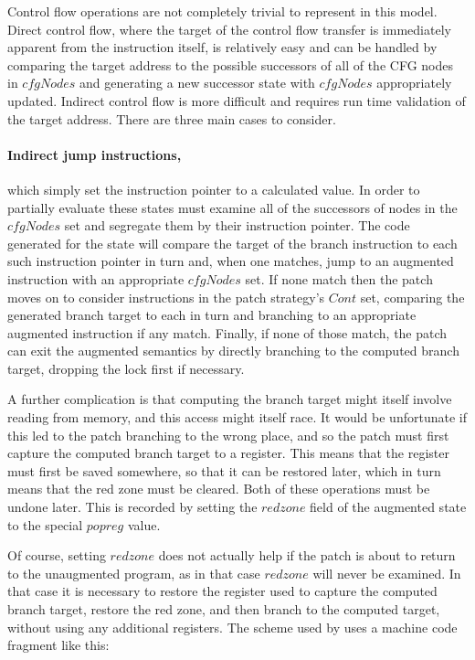 
Control flow operations are not completely trivial to represent in
this model.  Direct control flow, where the target of the control flow
transfer is immediately apparent from the instruction itself, is
relatively easy and can be handled by comparing the target address to
the possible successors of all of the CFG nodes in $cfgNodes$ and
generating a new successor state with $cfgNodes$ appropriately
updated.  Indirect control flow is more difficult and requires run
time validation of the target address.  There are three main cases to
consider.

\paragraph{Indirect jump instructions,} which simply set the instruction pointer
to a calculated value.  In order to partially evaluate these states
{\technique} must examine all of the successors of nodes in the
$cfgNodes$ set and segregate them by their instruction pointer.  The
code generated for the state will compare the target of the branch
instruction to each such instruction pointer in turn and, when one
matches, jump to an augmented instruction with an appropriate
$cfgNodes$ set.  If none match then the patch moves on to consider
instructions in the patch strategy's $Cont$ set, comparing the
generated branch target to each in turn and branching to an
appropriate augmented instruction if any match.  Finally, if none of
those match, the patch can exit the augmented semantics by directly
branching to the computed branch target, dropping the lock first if
necessary.

A further complication is that computing the branch target might
itself involve reading from memory, and this access might itself race.
It would be unfortunate if this led to the patch branching to the
wrong place, and so the patch must first capture the computed branch
target to a register.  This means that the register must first be
saved somewhere, so that it can be restored later, which in turn means
that the red zone must be cleared.  Both of these operations must be
undone later.  This is recorded by setting the $redzone$ field of the
augmented state to the special $popreg$ value.

Of course, setting $redzone$ does not actually help if the patch is
about to return to the unaugmented program, as in that case $redzone$
will never be examined.  In that case it is necessary to restore the
register used to capture the computed branch target, restore the red
zone, and then branch to the computed target, without using any
additional registers.  The scheme used by {\implementation} uses a
machine code fragment like this:

